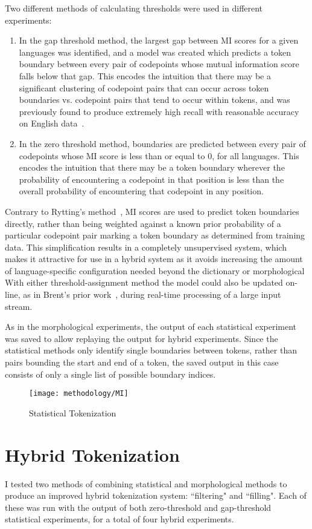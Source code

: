 Two different methods of calculating thresholds were used in different experiments:
\begin{enumerate}
	\item In the gap threshold method, the largest gap between MI scores for a given languages was identified, and a model was created which predicts a token boundary between every pair of codepoints whose mutual information score falls below that gap. This encodes the intuition that there may be a significant clustering of codepoint pairs that can occur across token boundaries vs. codepoint pairs that tend to occur within tokens, and was previously found to produce extremely high recall with reasonable accuracy on English data~\cite{kearsley14}.
	\item In the zero threshold method, boundaries are predicted between every pair of codepoints whose MI score is less than or equal to 0, for all languages. This encodes the intuition that there may be a token boundary wherever the probability of encountering a codepoint in that position is less than the overall probability of encountering that codepoint in any position.
\end{enumerate}
Contrary to Rytting's method~\cite{rytting04}, MI scores are used to predict token boundaries directly, rather than being weighted against a known prior probability of a particular codepoint pair marking a token boundary as determined from training data. This simplification results in a completely unsupervised system, which makes it attractive for use in a hybrid system as it avoids increasing the amount of language-specific configuration needed beyond the dictionary or morphological With either threshold-assignment method the model could also be updated on-line, as in Brent's prior work~\cite{brent99}, during real-time processing of a large input stream.

As in the morphological experiments, the output of each statistical experiment was saved to allow replaying the output for hybrid experiments. Since the statistical methods only identify single boundaries between tokens, rather than pairs bounding the start and end of a token, the saved output in this case consists of only a single list of possible boundary indices.

\begin{figure}
	\texttt{[image: methodology/MI]}
	\caption{Statistical Tokenization}
	\label{statdiagram}
\end{figure}

\section{Hybrid Tokenization}
I tested two methods of combining statistical and morphological methods to produce an improved hybrid tokenization system: ``filtering" and ``filling". Each of these was run with the output of both zero-threshold and gap-threshold statistical experiments, for a total of four hybrid experiments.


